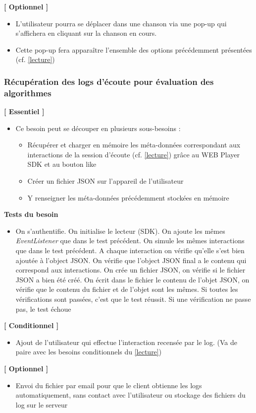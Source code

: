 \documentclass{article}
\begin{document}
		\textbf{[ Optionnel ]}
		\begin{itemize}
			\item L'utilisateur pourra se déplacer dans une chanson via une pop-up qui s'affichera en cliquant sur la chanson en cours. 
			\item Cette pop-up fera apparaître l'ensemble des options précédemment présentées (cf. \ref{lecture})
		\end{itemize}
		\newpage
		\subsubsection{Récupération des logs d'écoute pour évaluation des algorithmes} \label{logs}
		\textbf{[ Essentiel ]}
		\begin{itemize}
			\item Ce besoin peut se découper en plusieurs sous-besoins :
			      \begin{itemize}
			      	\item Récupérer et charger en mémoire les méta-données correspondant aux interactions de la session d'écoute (cf. \ref{lecture}) grâce au WEB Player SDK et au bouton like
			      	\item Créer un fichier JSON sur l'appareil de l'utilisateur
			      	\item Y renseigner les méta-données précédemment stockées en mémoire
			      \end{itemize}
		\end{itemize}
		\textbf{Tests du besoin}
		\begin{itemize}
			\item On s'authentifie. On initialise le lecteur (SDK). On ajoute les mêmes  \textit{EventListener} que dans le test précédent. On simule les mêmes interactions que dans le test précédent. A chaque interaction on vérifie qu'elle s'est bien ajoutée à l'object JSON. On vérifie que l'object JSON final a le contenu qui correspond aux interactions. On crée un fichier JSON, on vérifie si le fichier JSON a bien été créé. On écrit dans le fichier le contenu de l'objet JSON, on vérifie que le contenu du fichier et de l'objet sont les mêmes. Si toutes les vérifications sont passées, c’est que le test réussit. Si une vérification ne passe pas, le test échoue
		\end{itemize}
		\textbf{[ Conditionnel ]}
		\begin{itemize}
			\item Ajout de l'utilisateur qui effectue l'interaction recensée par le log. (Va de paire avec les besoins conditionnels du \ref{lecture})
		\end{itemize}
		\textbf{[ Optionnel ]}
		\begin{itemize}
			\item Envoi du fichier par email pour que le client obtienne les logs automatiquement, sans contact avec l'utilisateur ou stockage des fichiers du log sur le serveur
		\end{itemize}
\end{document}

